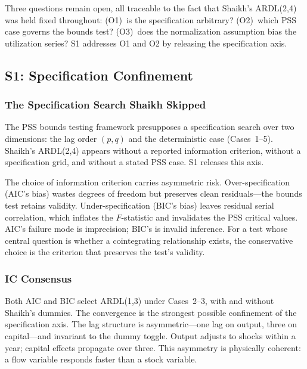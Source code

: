 \documentclass[11pt,a4paper]{article}
\begin{document}
Three questions remain open, all traceable to the fact that Shaikh's ARDL(2,4) was held fixed throughout: (O1)~is the specification arbitrary? (O2)~which PSS case governs the bounds test? (O3)~does the normalization assumption bias the utilization series? S1 addresses O1 and O2 by releasing the specification axis.



\subsection{S1: Specification Confinement}
\label{subsec:S1_results}


\subsubsection{The Specification Search Shaikh Skipped}

The PSS bounds testing framework presupposes a specification search over two dimensions: the lag order $(p, q)$ and the deterministic case (Cases~1--5). Shaikh's ARDL(2,4) appears without a reported information criterion, without a specification grid, and without a stated PSS case. S1 releases this axis.

The choice of information criterion carries asymmetric risk. Over-specification (AIC's bias) wastes degrees of freedom but preserves clean residuals---the bounds test retains validity. Under-specification (BIC's bias) leaves residual serial correlation, which inflates the $F$-statistic and invalidates the PSS critical values. AIC's failure mode is imprecision; BIC's is invalid inference. For a test whose central question is whether a cointegrating relationship exists, the conservative choice is the criterion that preserves the test's validity.


\subsubsection{IC Consensus}

Both AIC and BIC select ARDL(1,3) under Cases~2--3, with and without Shaikh's dummies. The convergence is the strongest possible confinement of the specification axis. The lag structure is asymmetric---one lag on output, three on capital---and invariant to the dummy toggle. Output adjusts to shocks within a year; capital effects propagate over three. This asymmetry is physically coherent: a flow variable responds faster than a stock variable.
\end{document}

